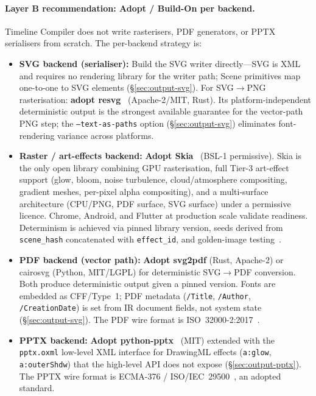 \paragraph{Layer B recommendation: Adopt / Build-On per backend.}
Timeline Compiler does not write rasterisers, PDF generators, or PPTX serialisers
from scratch.
The per-backend strategy is:

\begin{itemize}
  \item \textbf{SVG backend (serialiser):} Build the SVG writer directly---SVG is
        XML and requires no rendering library for the writer path; Scene primitives
        map one-to-one to SVG elements (\S\ref{sec:output-svg}).
        For SVG$\to$PNG rasterisation: \textbf{adopt resvg}~\cite{resvg}
        (Apache-2/MIT, Rust). Its platform-independent deterministic output is the
        strongest available guarantee for the vector-path PNG step; the
        \texttt{--text-as-paths} option (\S\ref{sec:output-svg}) eliminates
        font-rendering variance across platforms.

  \item \textbf{Raster / art-effects backend:} \textbf{Adopt
        Skia}~\cite{skia} (BSL-1 permissive). Skia is the only open library
        combining GPU rasterisation, full Tier-3 art-effect support (glow, bloom,
        noise turbulence, cloud/atmosphere compositing, gradient meshes, per-pixel
        alpha compositing), and a multi-surface architecture (CPU/PNG, PDF surface,
        SVG surface) under a permissive licence. Chrome, Android, and Flutter at
        production scale validate readiness.
        Determinism is achieved via pinned library version, seeds derived from
        \texttt{scene\_hash} concatenated with \texttt{effect\_id}, and golden-image
        testing~\cite{golden-image-testing}.

  \item \textbf{PDF backend (vector path):} \textbf{Adopt svg2pdf} (Rust, Apache-2)
        or cairosvg (Python, MIT/LGPL) for deterministic SVG$\to$PDF conversion.
        Both produce deterministic output given a pinned version. Fonts are embedded
        as CFF/Type~1; PDF metadata (\texttt{/Title}, \texttt{/Author},
        \texttt{/CreationDate}) is set from IR document fields, not system state
        (\S\ref{sec:output-svg}). The PDF wire format is
        ISO~32000-2:2017~\cite{pdf-iso32000}.

  \item \textbf{PPTX backend:} \textbf{Adopt python-pptx}~\cite{python-pptx} (MIT)
        extended with the \texttt{pptx.oxml} low-level XML interface for DrawingML
        effects (\texttt{a:glow}, \texttt{a:outerShdw}) that the high-level API does
        not expose (\S\ref{sec:output-pptx}). The PPTX wire format is ECMA-376 /
        ISO/IEC~29500~\cite{ooxml}, an adopted standard.


\end{itemize}
